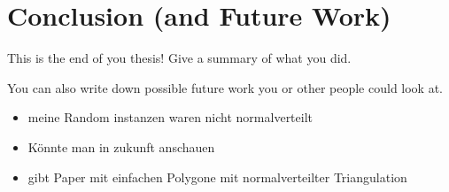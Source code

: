 \chapter{Conclusion (and Future Work)}

This is the end of you thesis! 
Give a summary of what you did.

You can also write down possible future work you or other people could look at.
\begin{itemize}
    \item meine Random instanzen waren nicht normalverteilt
    \item Könnte man in zukunft anschauen
    \item gibt Paper mit einfachen Polygone mit normalverteilter Triangulation
\end{itemize}
